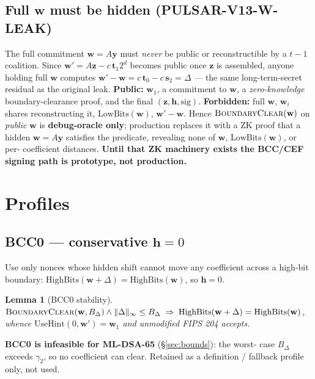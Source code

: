 \documentclass[11pt]{article}
\newtheorem{lemma}{Lemma}
\theoremstyle{remark}\newtheorem{remark}{Remark}
\begin{document}
\subsection{Full $\mathbf w$ must be hidden (PULSAR-V13-W-LEAK)}
The full commitment $\mathbf w = A\mathbf y$ must \emph{never} be public or
reconstructible by a $t-1$ coalition. Since $\mathbf w' = A\mathbf z -
c\,\mathbf t_1 2^d$ becomes public once $\mathbf z$ is assembled, anyone
holding full $\mathbf w$ computes $\mathbf w' - \mathbf w = c\,\mathbf t_0
- c\,\mathbf s_2 = \Delta$ --- the same long-term-secret residual as the
original leak. \textbf{Public:} $\mathbf w_1$, a commitment to $\mathbf w$,
a \emph{zero-knowledge} boundary-clearance proof, and the final $(\mathbf
z,\mathbf h,\text{sig})$. \textbf{Forbidden:} full $\mathbf w$, $\mathbf
w_i$ shares reconstructing it, $\mathrm{LowBits}(\mathbf w)$, $\mathbf w' -
\mathbf w$. Hence $\textsc{BoundaryClear}(\mathbf w)$ on \emph{public}
$\mathbf w$ is \textbf{debug-oracle only}; production replaces it with a ZK
proof that a hidden $\mathbf w = A\mathbf y$ satisfies the predicate,
revealing none of $\mathbf w$, $\mathrm{LowBits}(\mathbf w)$, or per-
coefficient distances. \textbf{Until that ZK machinery exists the BCC/CEF
signing path is prototype, not production.}

\section{Profiles}
\subsection{BCC0 --- conservative $\mathbf h = 0$}
Use only nonces whose hidden shift cannot move any coefficient across a
high-bit boundary: $\mathrm{HighBits}(\mathbf w + \Delta) =
\mathrm{HighBits}(\mathbf w)$, so $\mathbf h = 0$.
\begin{lemma}[BCC0 stability]\label{lem:bcc0}
$\textsc{BoundaryClear}(\mathbf w, B_\Delta) \wedge \|\Delta\|_\infty \le
B_\Delta \;\Rightarrow\; \mathrm{HighBits}(\mathbf w + \Delta) =
\mathrm{HighBits}(\mathbf w)$, whence $\mathrm{UseHint}(0, \mathbf w') =
\mathbf w_1$ and unmodified FIPS 204 accepts.
\end{lemma}
\textbf{BCC0 is infeasible for ML-DSA-65} (\S\ref{sec:bounds}): the worst-
case $B_\Delta$ exceeds $\gamma_2$, so no coefficient can clear. Retained
as a definition / fallback profile only, not used.
\end{document}
